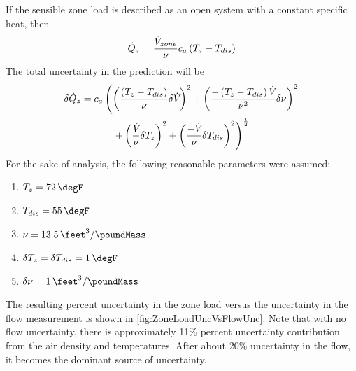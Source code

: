 If the sensible zone load is described as an open system with a constant specific
heat, then
\begin{equation}
    \dot{Q}_{z} =  \frac{\dot{V}_{zone}}{\nu} c_{a} \left(T_{z} - T_{dis}\right)
\end{equation}
%
The total uncertainty in the prediction will be
\begin{multline}
    \delta \dot{Q}_{z} = c_{a} \left(
 \left( \frac{\left(T_{z} -
        T_{dis}\right)}{\nu} \delta \dot{V}_{} \right)^2 
    + \left( \frac{-\left(T_{z} - T_{dis}\right) \dot{V}_{}}{\nu^{2}} \delta
    \nu \right)^{2} \right. \\ \left.
+ \left( \frac{\dot{V}_{}}{\nu} \delta T_{z}\right)^{2}
+ \left(\frac{-\dot{V}_{}}{\nu} \delta T_{dis}\right)^{2}
\right)^{\frac{1}{2}} 
\end{multline}
For the sake of analysis, the following reasonable parameters were assumed:
\begin{enumerate}
    \item \(T_{z} = \SI{72}{\degF} \)
    \item \(T_{dis} = \SI{55}{\degF} \)
    \item \(\nu = \SI{13.5}{\feet\cubed\per\poundMass}\)
    \item \(\delta T_{z} = \delta T_{dis} = \SI{1}{\degF}\)
    \item \( \delta \nu = \SI{1}{\feet\cubed\per\poundMass} \)
\end{enumerate}

The resulting percent uncertainty in the zone load versus the
uncertainty in the flow measurement is shown in \figref{}
\ref{fig:ZoneLoadUncVsFlowUnc}. Note that with no flow
uncertainty, there is approximately 11\% percent uncertainty
contribution from the air density and temperatures. After about 20\%
uncertainty in the flow, it becomes the dominant source of uncertainty. 



